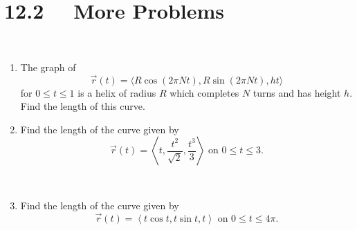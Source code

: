 \section*{12.2 \ \ More Problems}

\ 


\begin{enumerate}
\item  The graph of 
\[
\vec{r}(t) = \langle  R \cos(2\pi Nt), R\sin(2\pi Nt), ht \rangle
\]
for $0 \leq t \leq 1$ is a helix of radius $R$ which completes $N$ turns and has height $h$.  Find the length of this curve. \\

\item  Find the length of the curve given by 
\[
\vec{r}(t) = \left\langle t, \frac{t^2}{\sqrt{2}}, \frac{t^3}{3} \right\rangle \text{ on } 0 \leq t \leq 3.
\]

\ 

\item  Find the length of the curve given by 
\[
\vec{r}(t) = \left\langle t \cos t, t \sin t, t \right\rangle \text{ on } 0 \leq t \leq 4\pi.
\]

\end{enumerate}
